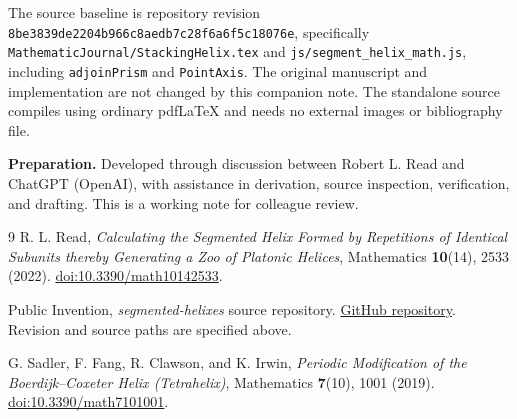 \documentclass[11pt,letterpaper]{article}
\begin{document}
The source baseline is repository revision
\texttt{8be3839de2204b966c8aedb7c28f6a6f5c18076e}, specifically
\texttt{MathematicJournal/StackingHelix.tex} and
\texttt{js/segment\_helix\_math.js}, including \texttt{adjoinPrism} and
\texttt{PointAxis}. The original manuscript and implementation are not
changed by this companion note. The standalone source compiles using
ordinary pdfLaTeX and needs no external images or bibliography file.

\textbf{Preparation.} Developed through discussion between Robert L. Read
and ChatGPT (OpenAI), with assistance in derivation, source inspection,
verification, and drafting. This is a working note for colleague review.

\begin{thebibliography}{9}
\small
\setlength{\itemsep}{0.15em}
R. L. Read, \emph{Calculating the Segmented Helix Formed by Repetitions of
Identical Subunits thereby Generating a Zoo of Platonic Helices},
Mathematics \textbf{10}(14), 2533 (2022).
\href{https://doi.org/10.3390/math10142533}{doi:10.3390/math10142533}.

Public Invention, \emph{segmented-helixes} source repository.
\href{https://github.com/PubInv/segmented-helixes}{GitHub repository}.
Revision and source paths are specified above.

G. Sadler, F. Fang, R. Clawson, and K. Irwin,
\emph{Periodic Modification of the Boerdijk--Coxeter Helix (Tetrahelix)},
Mathematics \textbf{7}(10), 1001 (2019).
\href{https://doi.org/10.3390/math7101001}{doi:10.3390/math7101001}.
\end{thebibliography}
\end{document}
